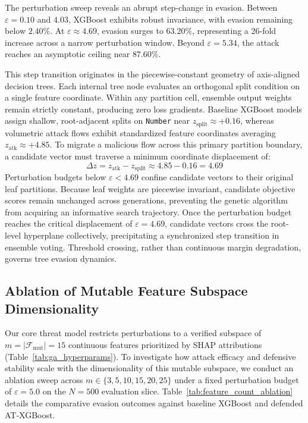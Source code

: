 \documentclass[iicol,pdflatex,sn-mathphys-num]{sn-jnl}
\begin{document}
The perturbation sweep reveals an abrupt step-change in evasion. Between $\varepsilon = 0.10$ and $4.03$, XGBoost exhibits robust invariance, with evasion remaining below $2.40\%$. At $\varepsilon \approx 4.69$, evasion surges to $63.20\%$, representing a 26-fold increase across a narrow perturbation window. Beyond $\varepsilon = 5.34$, the attack reaches an asymptotic ceiling near $87.60\%$.

This step transition originates in the piecewise-constant geometry of axis-aligned decision trees. Each internal tree node evaluates an orthogonal split condition on a single feature coordinate. Within any partition cell, ensemble output weights remain strictly constant, producing zero loss gradients. Baseline XGBoost models assign shallow, root-adjacent splits on \texttt{Number} near $z_{\text{split}} \approx +0.16$, whereas volumetric attack flows exhibit standardized feature coordinates averaging $z_{\text{atk}} \approx +4.85$. To migrate a malicious flow across this primary partition boundary, a candidate vector must traverse a minimum coordinate displacement of:
\begin{equation}
    \Delta z = z_{\text{atk}} - z_{\text{split}} \approx 4.85 - 0.16 = 4.69
\end{equation}
Perturbation budgets below $\varepsilon < 4.69$ confine candidate vectors to their original leaf partitions. Because leaf weights are piecewise invariant, candidate objective scores remain unchanged across generations, preventing the genetic algorithm from acquiring an informative search trajectory. Once the perturbation budget reaches the critical displacement of $\varepsilon = 4.69$, candidate vectors cross the root-level hyperplane collectively, precipitating a synchronized step transition in ensemble voting. Threshold crossing, rather than continuous margin degradation, governs tree evasion dynamics.

\subsection{Ablation of Mutable Feature Subspace Dimensionality}
\label{sec:feature_ablation}
Our core threat model restricts perturbations to a verified subspace of $m = |\mathcal{F}_{\text{mut}}| = 15$ continuous features prioritized by SHAP attributions (Table~\ref{tab:ga_hyperparams}). To investigate how attack efficacy and defensive stability scale with the dimensionality of this mutable subspace, we conduct an ablation sweep across $m \in \{3, 5, 10, 15, 20, 25\}$ under a fixed perturbation budget of $\varepsilon = 5.0$ on the $N=500$ evaluation slice. Table~\ref{tab:feature_count_ablation} details the comparative evasion outcomes against baseline XGBoost and defended AT-XGBoost.
\end{document}
